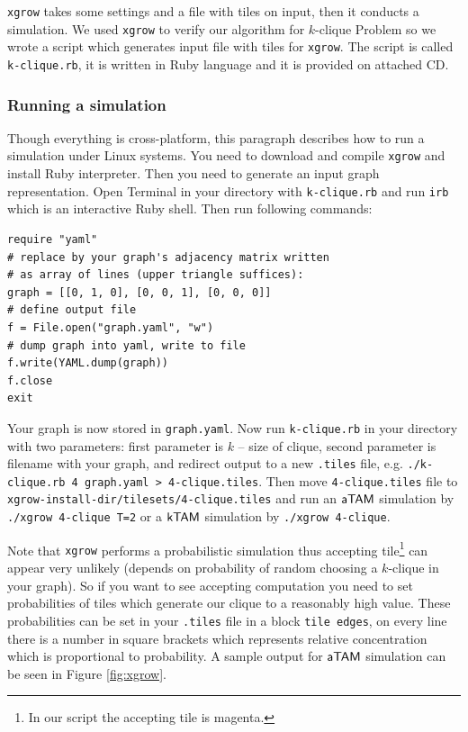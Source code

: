{\tt xgrow} takes some settings and a file with tiles on input, then it conducts a simulation. We used {\tt xgrow} to verify our algorithm for $k$-clique Problem so we wrote a script which generates input file with tiles for {\tt xgrow}. The script is called {\tt k-clique.rb}, it is written in Ruby language and it is provided on attached CD.

\subsubsection*{Running a simulation}

Though everything is cross-platform, this paragraph describes how to run a simulation under Linux systems. You need to download and compile {\tt xgrow} and install Ruby interpreter. Then you need to generate an input graph representation. Open Terminal in your directory with {\tt k-clique.rb} and run {\tt irb} which is an interactive Ruby shell. Then run following commands:
\begin{verbatim}
require "yaml"
# replace by your graph's adjacency matrix written
# as array of lines (upper triangle suffices):
graph = [[0, 1, 0], [0, 0, 1], [0, 0, 0]]
# define output file
f = File.open("graph.yaml", "w")
# dump graph into yaml, write to file
f.write(YAML.dump(graph))
f.close
exit
\end{verbatim}
Your graph is now stored in {\tt graph.yaml}. Now run {\tt k-clique.rb} in your directory with two parameters: first parameter is $k$ -- size of clique, second parameter is filename with your graph, and redirect output to a new {\tt *.tiles} file, e.g. {\tt ./k-clique.rb 4 graph.yaml > 4-clique.tiles}. Then move {\tt 4-clique.tiles} file to {\tt xgrow-install-dir/tilesets/4-clique.tiles} and run an $\mathsf{aTAM}$ simulation by {\tt ./xgrow 4-clique T=2} or a $\mathsf{kTAM}$ simulation by {\tt ./xgrow 4-clique}.

Note that {\tt xgrow} performs a probabilistic simulation thus accepting tile\footnote{In our script the accepting tile is magenta.} can appear very unlikely (depends on probability of random choosing a $k$-clique in your graph). So if you want to see accepting computation you need to set probabilities of tiles which generate our clique to a reasonably high value. These probabilities can be set in your {\tt *.tiles} file in a block {\tt tile edges}, on every line there is a number in square brackets which represents relative concentration which is proportional to probability. A sample output for $\mathsf{aTAM}$ simulation can be seen in Figure \ref{fig:xgrow}.

